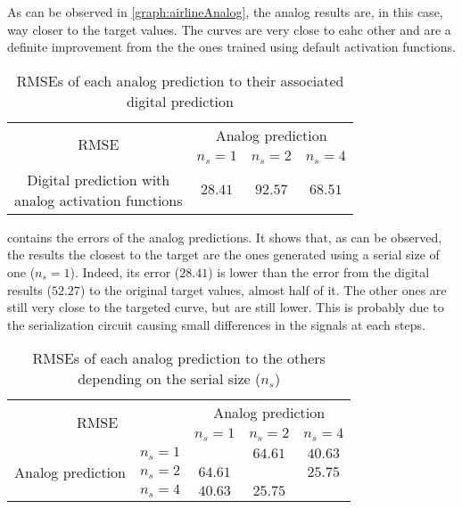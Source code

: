 As can be observed in \cref{graph:airlineAnalog}, the analog results are, in this case, way closer to the target values. The curves are very close to eahc other and are a definite improvement from the the ones trained using default activation functions.

\begin{table}[H]
  \centering
  \begin{tabular}{|c|c|c|c|}
    \hline
    \multirow{2}{*}{\acs{RMSE}} & \multicolumn{3}{|c|}{Analog prediction}\\
    \cline{2-4}
    & $n_s=1$ & $n_s=2$ & $n_s=4$ \\
    \hline
    \specialcell{Digital prediction with\\analog activation functions} & $28.41$ & $92.57$ & $68.51$\\
    \hline
  \end{tabular}
  \caption{\acp{RMSE} of each analog prediction to their associated digital prediction}
  \label{tab:airlineAnalog}
\end{table}

 contains the errors of the analog predictions. It shows that, as can be observed, the results the closest to the target are the ones generated using a serial size of one ($n_s=1$). Indeed, its error ($28.41$) is lower than the error from the digital results ($52.27$) to the original target values, almost half of it. The other ones are still very close to the targeted curve, but are still lower. This is probably due to the serialization circuit causing small differences in the signals at each steps.

\begin{table}[H]
  \centering
  \begin{tabular}{|c|c|c|c|c|}
    \hline
    \multicolumn{2}{|c}{\multirow{2}{*}{\ac{RMSE}}} & \multicolumn{3}{|c|}{Analog prediction}\\
    \cline{3-5}
    \multicolumn{2}{|c}{} & \multicolumn{1}{|c|}{$n_s=1$} & $n_s=2$ & $n_s=4$ \\
    \hline
    \multirow{3}{*}{Analog prediction} & $n_s=1$ &\cellcolor[HTML]{202020} & $64.61$ & $40.63$\\
    \cline{2-5}
    & $n_s=2$  & $64.61$ & \cellcolor[HTML]{202020} & $25.75$\\
    \cline{2-5}
    & $n_s=4$ & $40.63$ & $25.75$ & \cellcolor[HTML]{202020}\\
    \hline
  \end{tabular}
  \caption{\acp{RMSE} of each analog prediction to the others depending on the serial size ($n_s$)}
  \label{tab:airlineAnalogError}
\end{table}

